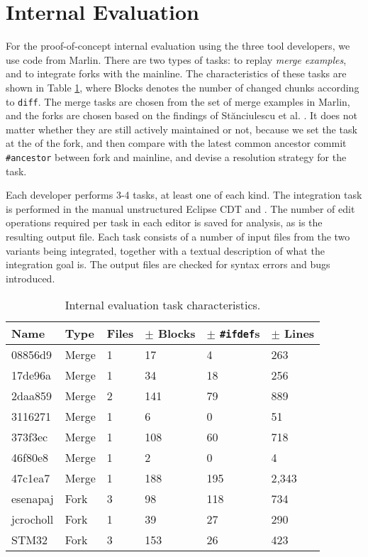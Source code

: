 \section{Internal Evaluation}
For the proof-of-concept internal evaluation using the three tool developers, we use code from Marlin. There are two types of tasks: to replay \textit{merge examples}, and to integrate forks with the mainline. The characteristics of these tasks are shown in Table \ref{tab:internalchar}, where Blocks denotes the number of changed chunks according to \texttt{diff}. The merge tasks are chosen from the set of merge examples in Marlin, and the forks are chosen based on the findings of St\u{a}nciulescu et al. \cite{stanciulescu2015}. It does not matter whether they are still actively maintained or not, because we set the task at the \head of the fork, and then compare with the latest common ancestor commit \texttt{\#ancestor} between fork and mainline, and devise a resolution strategy for the task.

Each developer performs 3-4 tasks, at least one of each kind. The integration task is performed in the manual unstructured Eclipse CDT and \tooln. The number of edit operations required per task in each editor is saved for analysis, as is the resulting output file. Each task consists of a number of input files from the two variants being integrated, together with a textual description of what the integration goal is. The output files are checked for syntax errors and bugs introduced.

\begin{table}[ht]
    \centering
    \caption{Internal evaluation task characteristics.}
    \label{tab:internalchar}
    \begin{tabular}{lll|lll}
\hline\hline
\textbf{Name} & \textbf{Type} & \textbf{Files} & \textbf{$\pm$ Blocks} & \textbf{$\pm$ \texttt{\#ifdef}s} & \textbf{$\pm$ Lines} \\
\hline
08856d9      & Merge     & 1 & 17    & 4     & 263   \\
17de96a      & Merge     & 1 & 34    & 18    & 256   \\
2daa859      & Merge     & 2 & 141 & 79      & 889   \\
3116271      & Merge     & 1 & 6     & 0     & 51    \\
373f3ec      & Merge     & 1 & 108 & 60      & 718   \\
46f80e8      & Merge     & 1 & 2     & 0     & 4     \\
47c1ea7      & Merge     & 1 & 188   & 195   & 2,343 \\
\hline
esenapaj     & Fork         & 3 & 98    & 118   & 734   \\
jcrocholl    & Fork         & 1 & 39    & 27    & 290   \\
STM32        & Fork         & 3 & 153   & 26    & 423   \\
\hline\hline
    \end{tabular}
\end{table}


